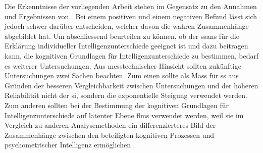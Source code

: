 \documentclass[11pt, twoside, a4paper]{book}		%
\begin{document}
Die Erkenntnisse der vorliegenden Arbeit stehen im Gegensatz zu den Annahmen und Ergebnissen von \citet{Melnick2013}. 
Bei einem positiven und einem negativen Befund lässt sich jedoch schwer darüber entscheiden, welcher davon die wahren Zusammenhänge abgebildet hat. 
Um abschliessend beurteilen zu können, ob der \gls{ssans} \citep{Melnick2013} für die Erklärung individueller Intelligenzunterschiede geeignet ist und dazu beitragen kann, die kognitiven Grundlagen für Intelligenzunterschiede zu bestimmen, bedarf es weiterer Untersuchungen.
Aus messtechnischer Hinsicht sollten zukünftige Untersuchungen zwei Sachen beachten. Zum einen sollte als Mass für \gls{ss} aus Gründen der besseren Vergleichbarkeit zwischen Untersuchungen und der höheren Reliabilität nicht der \gls{si}, sondern die exponentielle Steigung verwendet werden. 
Zum anderen sollten bei der Bestimmung der kognitiven Grundlagen für Intelligenzunterschiede auf latenter Ebene \glspl{flm} \citep[z.~B.][]{Schweizer2006a, Schweizer2006b, Schweizer2007, Schweizer2008, Schweizer2009a} verwendet werden, weil sie im Vergleich zu anderen Analysemethoden ein differenzierteres Bild der Zusammenhänge zwischen den beteiligten kognitiven Prozessen und psychometrischer Intelligenz ermöglichen \citep[siehe][]{Ren2013, Schweizer2007, Stankov2007, Wang2015}.




\cleardoublepage								%
\renewcommand\bibname{Literatur}				%


\end{document}

